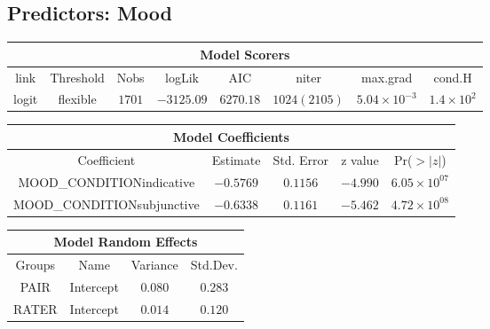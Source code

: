 \subsection{Predictors: Mood}
\begin{minipage}{\linewidth}
\begin{tabular}{|c|c|c|c|c|c|c|c|}
\hline
\multicolumn{8}{|c|}{Model Scorers}\\\hline
link  &  Threshold & Nobs & logLik & AIC & niter & max.grad & cond.H\\\hline
logit & flexible & $1701$ & $-3125.09$ & $6270.18$ & $1024(2105)$ & $5.04\times 10^{-3}$ & $1.4\times 10^{2}$\\\hline
\end{tabular}
\end{minipage}
\newline
\newline
\newline
\begin{minipage}{\linewidth}
	\begin{tabular}{|c|c|c|c|c|}
	\hline
	\multicolumn{5}{|c|}{Model Coefficients}\\\hline
	Coefficient & Estimate & Std. Error & z value &Pr($>|z|$)\\\hline
	MOOD\_CONDITIONindicative  & $-0.5769$ & $0.1156$ & $-4.990$ & $6.05\times10^{07}$\\\hline
	MOOD\_CONDITIONsubjunctive & $-0.6338$ & $0.1161$ & $-5.462$ & $4.72\times10^{08}$\\\hline
	\end{tabular}
\end{minipage}
\newline
\newline
\newline
\begin{minipage}{\linewidth}
\begin{tabular}{|c|c|c|c|}
\hline
\multicolumn{4}{|c|}{Model Random Effects}\\\hline
Groups  &  Name       &  Variance & Std.Dev.\\\hline
PAIR  & Intercept & $0.080$   & $0.283$  \\\hline
RATER & Intercept & $0.014$   & $0.120$ \\\hline
\end{tabular}
\end{minipage}
